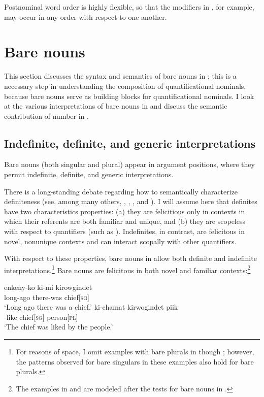 \documentclass[output=paper]{LSP/langsci}
\begin{document}
\noindent Postnominal word order is highly flexible, so that the modifiers in , for example, may occur in any order with respect to one another.

\section{Bare nouns} 
\label{sec:landman:barenouns}

This section discusses the syntax and semantics of bare nouns in ; this is a necessary step in understanding the composition of quantificational nominals, because bare nouns serve as building blocks for quantificational nominals. I look at the various interpretations of bare nouns in  and discuss the semantic contribution of number in . 

\subsection{Indefinite, definite, and generic interpretations}
\label{sec:landman:barenounsinterpretations}
Bare nouns (both singular and plural) appear in argument positions, where they permit indefinite, definite, and generic interpretations.

There is a long-standing debate regarding how to semantically characterize definiteness (see, among many others, \citealt{Frege:1892}, \citealt{Russell:1905}, \citealt{Heim:1982}, and \citealt{schwarz:2009}). I will assume here that definites have two characteristics properties: (a) they are felicitious only in contexts in which their referents are both familiar and unique, and (b) they are scopeless with respect to quantifiers (such as ). Indefinites, in contrast, are felicitous in novel, nonunique contexts and can interact scopally with other quantifiers.

With respect to these properties, bare nouns in  allow both definite and indefinite interpretations.\footnote{For reasons of space, I omit examples with bare plurals in  though ; however, the patterns observed for bare singulars in these examples also hold for bare plurals.} Bare nouns are felicitous in both novel and familiar contexts:\footnote{The examples in  and  are modeled after the tests for bare nouns in \citet{Gillon:2015}.}

\ea \label{ex:landman:novelunique} 
  \settowidth {}  
  \ea \label{ex:landman:novel}
     \gll enkeny-ko ki-mi kirowgindet\\
          long-ago there-was chief[\textsc{sg}]\\ 
     \glt ‘Long ago there was a chief.’
  \ex \label{ex:landman:familiar}
     \gll ki-chamat kirwogindet piik\\
          \pass-like chief[\textsc{sg}] person[\textsc{pl}]\\ 
     \glt ‘The chief was liked by the people.’
  \z
\z 
\end{document}
